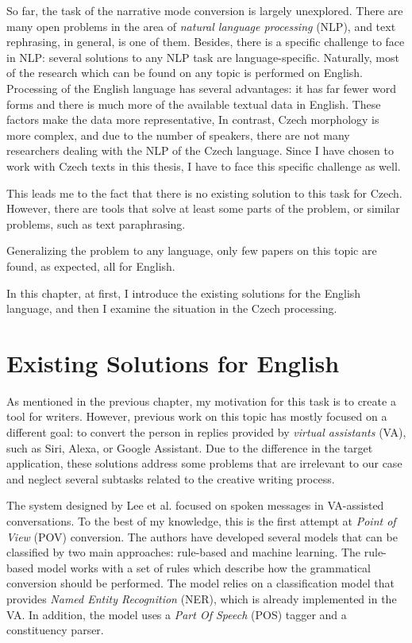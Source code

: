 So far, the task of the narrative mode conversion is largely unexplored. There are many open problems in the area of \emph{natural language processing} (NLP), and text rephrasing, in general, is one of them. Besides, there is a specific challenge to face in NLP: several solutions to any NLP task are language-specific. Naturally, most of the research which can be found on any topic is performed on English. Processing of the English language has several advantages: it has far fewer word forms and there is much more of the available textual data in English. These factors make the data more representative, In contrast, Czech morphology is more complex, and due to the number of speakers, there are not many researchers dealing with the NLP  of the Czech language. Since I have chosen to work with Czech texts in this thesis, I have to face this specific challenge as well.

This leads me to the fact that there is no existing solution to this task for Czech. However, there are tools that solve at least some parts of the problem, or similar problems, such as text paraphrasing.

Generalizing the problem to any language, only few papers on this topic are found, as expected, all for English.

In this chapter, at first, I introduce the existing solutions for the English language, and then I examine the situation in the Czech processing.

\section{Existing Solutions for English}

As mentioned in the previous chapter, my motivation for this task is to create a tool for writers. However, previous work on this topic has mostly focused on a different goal: to convert the person in replies provided by \emph{virtual assistants} (VA), such as Siri, Alexa, or Google Assistant. Due to the difference in the target application, these solutions address some problems that are irrelevant to our case and neglect several subtasks related to the creative writing process.

The system designed by Lee et al. \cite{lee2020converting} focused on spoken messages in VA-assisted conversations. To the best of my knowledge, this is the first attempt at \emph{Point of View} (POV) conversion. The authors have developed several models that can be classified by two main approaches: rule-based and machine learning. The rule-based model works with a set of rules which describe how the grammatical conversion should be performed. The model relies on a classification model that provides \emph{Named Entity Recognition} (NER), which is already implemented in the VA. In addition, the model uses a \emph{Part Of Speech} (POS) tagger and a constituency parser.

